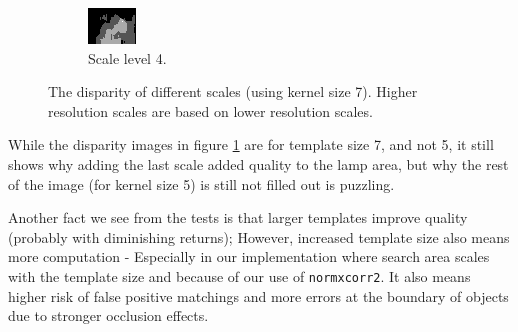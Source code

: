 \documentclass[12pt,a4paper,oneside,final]{article}
\begin{document}
\begin{table}[H]
\begin{subtable}{1\textwidth}
{\begin{figure}[H]
\begin{subfigure}[b]{0.24\textwidth}
				\includegraphics[width=\textwidth]{disparity4set_1.png}
				\caption{Scale level 4.}
			\end{subfigure}
			\caption{The disparity of different scales (using kernel size 7). Higher resolution scales are based on lower resolution scales.}
			\label{fig:lowlevel}
		\end{figure}
		While the disparity images in figure \ref{fig:lowlevel} are for template size 7, and not 5, it still shows why adding the last scale added quality to the lamp area, but why the rest of the image (for kernel size 5) is still not filled out is puzzling.}
	\fi
	Another fact we see from the tests is that larger templates improve quality (probably with diminishing returns); However, increased template size also means more computation - Especially in our implementation where search area scales with the template size and because of our use of \texttt{normxcorr2}. It also means higher risk of false positive matchings and more errors at the boundary of objects due to stronger occlusion effects.\\\\

	

\end{subtable}
\end{table}
\end{document}
